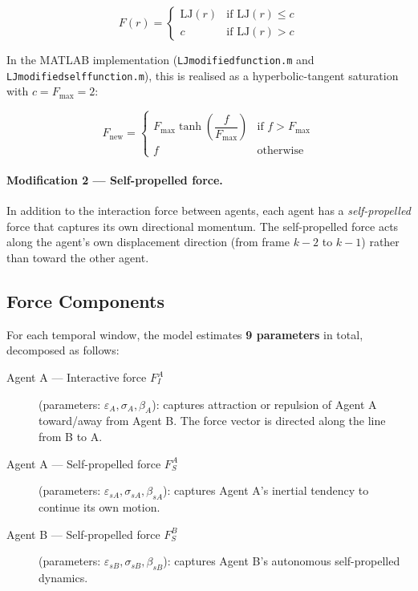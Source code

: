 \documentclass[11pt,a4paper]{article}
\begin{document}
\begin{equation}
    F(r) = \begin{cases}
        \mathrm{LJ}(r) & \text{if } \mathrm{LJ}(r) \leq c \\
        c & \text{if } \mathrm{LJ}(r) > c
    \end{cases}
\end{equation}

\noindent In the MATLAB implementation (\texttt{LJmodifiedfunction.m} and \texttt{LJmodifiedselffunction.m}), this is realised as a hyperbolic-tangent saturation with $c = F_{\max} = 2$:

\begin{equation}
    F_{\text{new}} = \begin{cases}
        F_{\max} \tanh\!\left(\dfrac{f}{F_{\max}}\right) & \text{if } f > F_{\max} \\[6pt]
        f & \text{otherwise}
    \end{cases}
\end{equation}

\paragraph{Modification 2 --- Self-propelled force.} In addition to the interaction force between agents, each agent has a \emph{self-propelled} force that captures its own directional momentum. The self-propelled force acts along the agent's own displacement direction (from frame $k-2$ to $k-1$) rather than toward the other agent.

\subsection{Force Components}

For each temporal window, the model estimates \textbf{9 parameters} in total, decomposed as follows:

\begin{description}
    \item[Agent A --- Interactive force $F_I^A$] (parameters: $\varepsilon_A, \sigma_A, \beta_A$): captures attraction or repulsion of Agent A toward/away from Agent B. The force vector is directed along the line from B to A.

    \item[Agent A --- Self-propelled force $F_S^A$] (parameters: $\varepsilon_{sA}, \sigma_{sA}, \beta_{sA}$): captures Agent A's inertial tendency to continue its own motion.

    \item[Agent B --- Self-propelled force $F_S^B$] (parameters: $\varepsilon_{sB}, \sigma_{sB}, \beta_{sB}$): captures Agent B's autonomous self-propelled dynamics.
\end{description}
\end{document}
